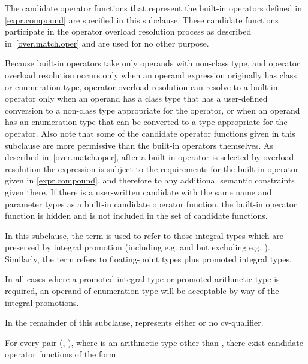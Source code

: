 \pnum
The candidate operator functions that represent the built-in operators
defined in \ref{expr.compound} are specified in this subclause.
These candidate
functions participate in the operator overload resolution process as
described in~\ref{over.match.oper} and are used for no other purpose.
\begin{note}
Because built-in operators take only operands with non-class type,
and operator overload resolution occurs only when an operand expression
originally has class or enumeration type,
operator overload resolution can resolve to a built-in operator only
when an operand has a class type that has a user-defined conversion to
a non-class type appropriate for the operator, or when an operand has
an enumeration type that can be converted to a type appropriate
for the operator.
Also note that some of the candidate operator functions given in this subclause are
more permissive than the built-in operators themselves.
As
described in~\ref{over.match.oper}, after a built-in operator is selected
by overload resolution the expression is subject to the requirements for
the built-in operator given in \ref{expr.compound}, and therefore to any
additional semantic constraints given there.
If there is a user-written
candidate with the same name and parameter types as a built-in
candidate operator function, the built-in operator function
is hidden and is not included in the set of candidate functions.
\end{note}

\pnum
{}%
%
In this subclause, the term
is used to refer to those integral types which are preserved by
integral promotion (including e.g.
and
but excluding e.g.
).
Similarly, the term
refers to floating-point types plus promoted integral types.
\begin{note}
In all cases where a promoted integral type or promoted arithmetic type is
required, an operand of enumeration type will be acceptable by way of the
integral promotions.
\end{note}

\pnum
In the remainder of this subclause,  represents either
 or no cv-qualifier.

\pnum
For every pair
(,
),
where
is an arithmetic type other than ,
there exist candidate operator functions of the form

